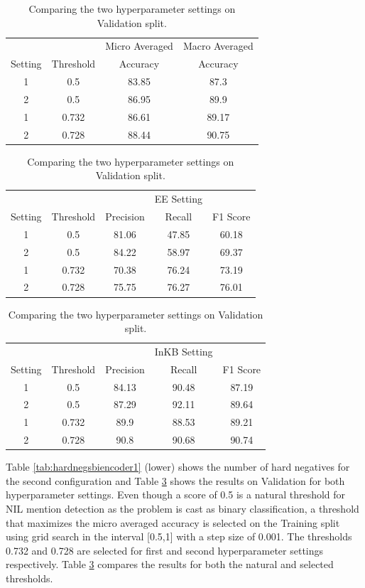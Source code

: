 \documentclass{report}
\theoremstyle{definition}
\theoremstyle{remark}
\begin{document}
\begin{table}
    \centering
    \begin{tabular}{cccc}
    &&Micro Averaged & Macro Averaged\\
    Setting & Threshold     & Accuracy &Accuracy \\
    \hline
    1  & 0.5&83.85&87.3\\
    2  & 0.5&86.95&89.9\\
    1  & 0.732&86.61&89.17\\
    2  & 0.728&88.44&90.75\\
    \end{tabular}
    
    \vspace{0.5cm}\begin{tabular}{ccccc}
    &&&EE Setting & \\
    Setting    & Threshold & Precision & Recall & F1 Score \\
    \hline
    1  & 0.5&81.06	&47.85&	60.18\\
    2  & 0.5&84.22&	58.97&	69.37\\
    1  & 0.732&70.38&	76.24&	73.19\\
    2  & 0.728&75.75&	76.27&	76.01\\
    \end{tabular}
    
    \vspace{0.5cm}\begin{tabular}{ccccc}
    &&&InKB Setting & \\
    Setting    & Threshold& Precision & Recall & F1 Score \\
    \hline
    1  & 0.5&84.13&	90.48&	87.19\\
    2  & 0.5&87.29&	92.11&	89.64\\
    1  & 0.732&89.9&	88.53&	89.21\\
    2  &0.728&90.8&	90.68&	90.74\\
    \end{tabular}
    \caption{Comparing the two hyperparameter settings on Validation split.}
    \label{tab:biencoderadaptres}
\end{table}

Table \ref{tab:hardnegsbiencoder1} (lower) shows the number of hard negatives for the second configuration and Table \ref{tab:biencoderadaptres} shows the results on Validation for both hyperparameter settings. Even though a score of 0.5 is a natural threshold for NIL mention detection as the problem is cast as binary classification, a threshold that maximizes the micro averaged accuracy is selected on the Training split using grid search in the interval [0.5,1] with a step size of 0.001. The thresholds 0.732 and 0.728 are selected for first and second hyperparameter settings respectively. Table \ref{tab:biencoderadaptres} compares the results for both the natural and selected thresholds.
\end{document}
